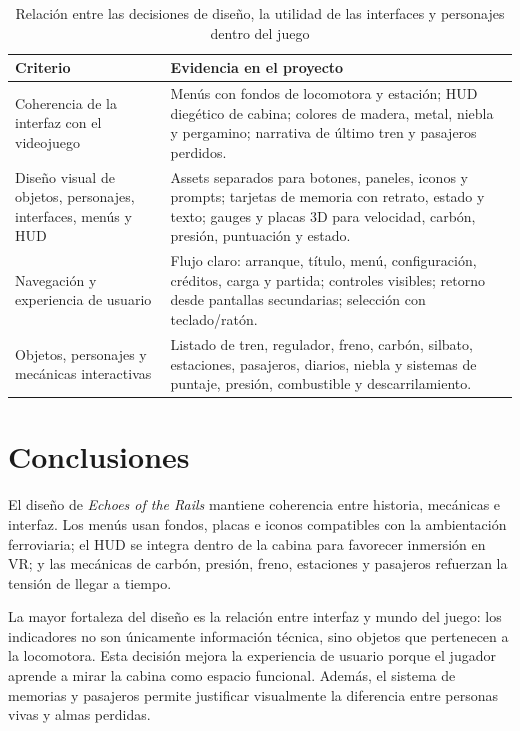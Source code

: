 \documentclass[12pt,letterpaper]{article}
\begin{document}
\begin{table}[H]
\centering
\caption{Relación entre las decisiones de diseño, la utilidad de las interfaces y personajes dentro del juego }
\small
\begin{tabularx}{\textwidth}{L{4cm}Y}
\toprule
\textbf{Criterio} & \textbf{Evidencia en el proyecto} \\
\midrule
Coherencia de la interfaz con el videojuego & Menús con fondos de locomotora y estación; HUD diegético de cabina; colores de madera, metal, niebla y pergamino; narrativa de último tren y pasajeros perdidos. \\
Diseño visual de objetos, personajes, interfaces, menús y HUD & Assets separados para botones, paneles, iconos y prompts; tarjetas de memoria con retrato, estado y texto; gauges y placas 3D para velocidad, carbón, presión, puntuación y estado. \\
Navegación y experiencia de usuario & Flujo claro: arranque, título, menú, configuración, créditos, carga y partida; controles visibles; retorno desde pantallas secundarias; selección con teclado/ratón. \\
Objetos, personajes y mecánicas interactivas & Listado de tren, regulador, freno, carbón, silbato, estaciones, pasajeros, diarios, niebla y sistemas de puntaje, presión, combustible y descarrilamiento. \\
\bottomrule
\end{tabularx}
\end{table}

\section{Conclusiones}

El diseño de \textit{Echoes of the Rails} mantiene coherencia entre historia, mecánicas e interfaz. Los menús usan fondos, placas e iconos compatibles con la ambientación ferroviaria; el HUD se integra dentro de la cabina para favorecer inmersión en VR; y las mecánicas de carbón, presión, freno, estaciones y pasajeros refuerzan la tensión de llegar a tiempo.

La mayor fortaleza del diseño es la relación entre interfaz y mundo del juego: los indicadores no son únicamente información técnica, sino objetos que pertenecen a la locomotora. Esta decisión mejora la experiencia de usuario porque el jugador aprende a mirar la cabina como espacio funcional. Además, el sistema de memorias y pasajeros permite justificar visualmente la diferencia entre personas vivas y almas perdidas.
\end{document}
